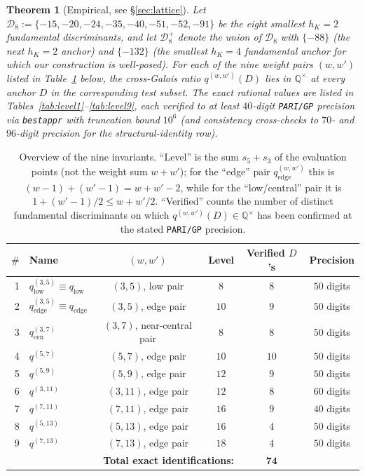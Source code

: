 \documentclass[11pt,a4paper]{amsart}
\theoremstyle{plain}
\newtheorem{theorem}{Theorem}[section]
\theoremstyle{definition}
\newcommand{\Q}{\mathbb{Q}}
\newcommand{\qstr}[2]{q^{(#1,#2)}}
\begin{document}
\begin{theorem}[Empirical, see \S\ref{sec:lattice}]\label{thm:main-empirical}
Let $\mathcal{D}_8 := \{-15,-20,-24,-35,-40,-51,-52,-91\}$ be the eight
smallest $h_K = 2$ fundamental discriminants, and let $\mathcal{D}_8^+$ denote
the union of $\mathcal{D}_8$ with $\{-88\}$ (the next $h_K=2$ anchor) and
$\{-132\}$ (the smallest $h_K = 4$ fundamental anchor for which our
construction is well-posed). For each of the nine weight pairs
$(w, w')$ listed in Table~\ref{tab:lattice-overview} below, the
cross-Galois ratio $\qstr{w}{w'}(D)$ lies in $\Q^{\times}$ at every anchor
$D$ in the corresponding test subset. The exact rational values are
listed in Tables~\ref{tab:level1}--\ref{tab:level9}, each verified to at
least $40$-digit \texttt{PARI/GP} precision via \texttt{bestappr} with
truncation bound $10^6$ (and consistency cross-checks to $70$- and
$96$-digit precision for the structural-identity row).
\end{theorem}

\begin{table}[h]
\centering
\caption{Overview of the nine invariants. ``Level'' is the sum
$s_5+s_3$ of the evaluation points (not the weight sum $w+w'$); for
the ``edge'' pair $\qstr{w}{w'}_{\mathrm{edge}}$ this is
$(w-1)+(w'-1) = w+w' - 2$, while for the ``low/central'' pair it is
$1 + (w'-1)/2 \le w+w'/2$. ``Verified'' counts the number of
distinct fundamental discriminants
on which $\qstr{w}{w'}(D)\in\Q^{\times}$ has been confirmed at the stated
\texttt{PARI/GP} precision.}\label{tab:lattice-overview}
\begin{tabular}{rlcccc}
\toprule
$\#$ & Name & $(w,w')$ & Level & Verified $D$'s & Precision \\
\midrule
1 & $\qstr{3}{5}_{\mathrm{low}} \equiv q_{\mathrm{low}}$
  & $(3,5)$, low pair  & $8$  & $8$ & $50$ digits\\
2 & $\qstr{3}{5}_{\mathrm{edge}} \equiv q_{\mathrm{edge}}$
  & $(3,5)$, edge pair & $10$ & $9$ & $50$ digits\\
3 & $\qstr{3}{7}_{\mathrm{cen}}$
  & $(3,7)$, near-central pair\footnotemark[1] & $8$ & $8$ & $50$ digits\\
4 & $\qstr{5}{7}$
  & $(5,7)$, edge pair  & $10$ & $10$ & $50$ digits\\
5 & $\qstr{5}{9}$
  & $(5,9)$, edge pair  & $12$ & $9$ & $50$ digits\\
6 & $\qstr{3}{11}$
  & $(3,11)$, edge pair & $12$ & $8$ & $60$ digits\\
7 & $\qstr{7}{11}$
  & $(7,11)$, edge pair & $16$ & $9$ & $40$ digits\\
8 & $\qstr{5}{13}$
  & $(5,13)$, edge pair & $16$ & $4$ & $50$ digits\\
9 & $\qstr{7}{13}$
  & $(7,13)$, edge pair & $18$ & $4$ & $50$ digits\\
\midrule
\multicolumn{4}{r}{\textbf{Total exact identifications:}} & $\mathbf{74}$ & \\
\bottomrule
\end{tabular}
\end{table}
\end{document}
